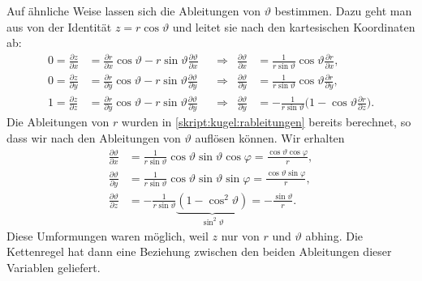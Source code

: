 Auf ähnliche Weise lassen sich die Ableitungen von $\vartheta$ bestimmen.
Dazu geht man aus von der Identität $z=r\cos\vartheta$ und leitet sie
nach den kartesischen Koordinaten ab:
\begin{align*}
0
=
\frac{\partial z}{\partial x}
&=
\frac{\partial r}{\partial x}\cos\vartheta
-
r\sin\vartheta\frac{\partial \vartheta}{\partial x}
&&\Rightarrow&
\frac{\partial\vartheta}{\partial x}
&=
\frac{1}{r\sin\vartheta}
\cos\vartheta
\frac{\partial r}{\partial x},
\\
0
=
\frac{\partial z}{\partial y}
&=
\frac{\partial r}{\partial y}\cos\vartheta
-
r\sin\vartheta\frac{\partial \vartheta}{\partial y}
&&\Rightarrow&
\frac{\partial \vartheta}{\partial y}
&=
\frac{1}{r\sin\vartheta}
\cos\vartheta
\frac{\partial r}{\partial y},
\\
1
=
\frac{\partial z}{\partial z}
&=
\frac{\partial r}{\partial y}\cos\vartheta
-
r\sin\vartheta\frac{\partial \vartheta}{\partial y}
&&\Rightarrow&
\frac{\partial\vartheta}{\partial y}
&=
-\frac1{r\sin\vartheta}
\biggl(1-
\cos\vartheta
\frac{\partial r}{\partial z}
\biggr).
\end{align*}
Die Ableitungen von $r$ wurden in \eqref{skript:kugel:rableitungen}
bereits berechnet, so dass wir nach den
Ableitungen von $\vartheta$ auflösen können.
Wir erhalten
\begin{equation}
\begin{aligned}
\frac{\partial\vartheta}{\partial x}
&=
\frac1{r\sin\vartheta} \cos\vartheta \sin\vartheta\cos\varphi
=
\frac{\cos\vartheta\cos\varphi}{r},
\\
\frac{\partial\vartheta}{\partial y}
&=
\frac{1}{r\sin\vartheta} \cos\vartheta \sin\vartheta\sin\varphi
=
\frac{\cos\vartheta\sin\varphi}{r},
\\
\frac{\partial\vartheta}{\partial z}
&=
-\frac{1}{r\sin\vartheta}\underbrace{(1-\cos^2\vartheta)}_{\displaystyle\sin^2\vartheta}
=
-
\frac{\sin\vartheta}r.
\end{aligned}
\label{skript:kugel:thetaableitungen}
\end{equation}
Diese Umformungen waren möglich, weil $z$ nur von $r$ und $\vartheta$ abhing.
Die Kettenregel hat dann eine Beziehung zwischen den beiden Ableitungen
dieser Variablen geliefert.

